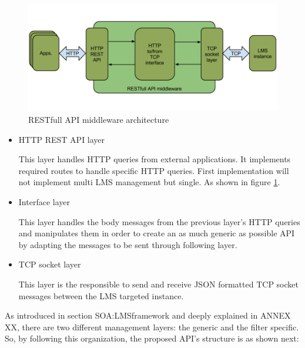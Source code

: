 \begin{figure}[!htb]
\begin{center}
\includegraphics[width=1\textwidth]{./images/RESTAPI.png}
\caption{RESTfull API middleware architecture}
\label{F:restAPI}
\end{center}
\end{figure}

\begin{itemize}
\item HTTP REST API layer \hfill

This layer handles HTTP queries from external applications. It implements required routes to handle specific HTTP queries. First implementation will not implement multi LMS management but single. As shown in figure \ref{F:restAPI}.

\item Interface layer \hfill

This layer handles the body messages from the previous layer's HTTP queries and manipulates them in order to create an as much generic as possible API by adapting the messages to be sent through following layer.

\item TCP socket layer \hfill

This layer is the responsible to send and receive JSON formatted TCP socket messages between the LMS targeted instance.
\end{itemize}

As introduced in section {SOA:LMSframework} and deeply explained in ANNEX XX, there are two different management layers: the generic and the filter specific. So, by following this organization, the proposed API's structure is as shown next:

